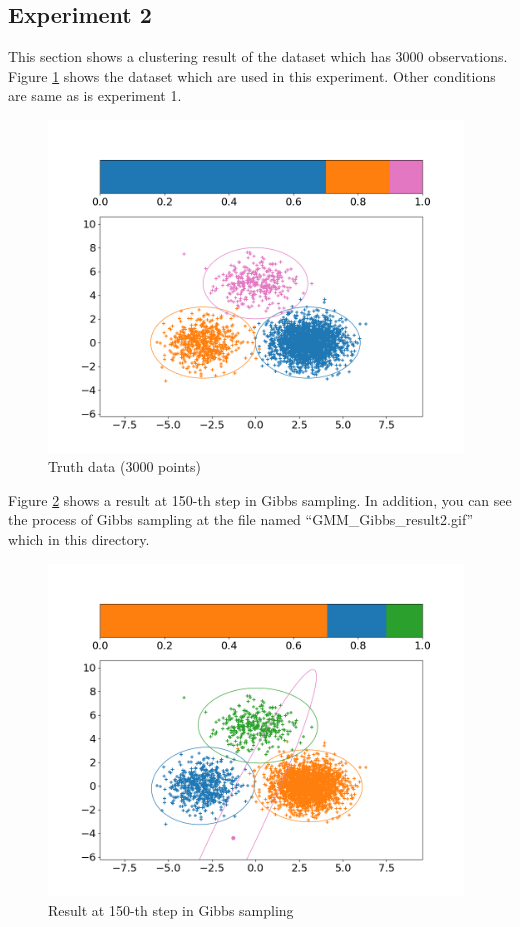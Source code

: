 \documentclass[a4paper]{article}
\begin{document}
\subsection{Experiment 2}
This section shows a clustering result of the dataset which has 3000 observations.
Figure \ref{fig:ex2_truth} shows the dataset which are used in this experiment.
Other conditions are same as is experiment 1.
\begin{figure}[h]
	\begin{center}
		\includegraphics[width=11cm]{fig/ex2/truth.png}
		\caption{Truth data (3000 points)}
		\label{fig:ex2_truth}
	\end{center}
\end{figure}

Figure \ref{fig:ex2_result} shows a result at 150-th step in Gibbs sampling.
In addition, you can see the process of Gibbs sampling at the file named ``GMM\_Gibbs\_result2.gif'' which in this directory.
\begin{figure}[h]
	\begin{center}
		\includegraphics[width=11cm]{fig/ex2/final.png}
		\caption{Result at 150-th step in Gibbs sampling}
		\label{fig:ex2_result}
	\end{center}
\end{figure}
\end{document}
